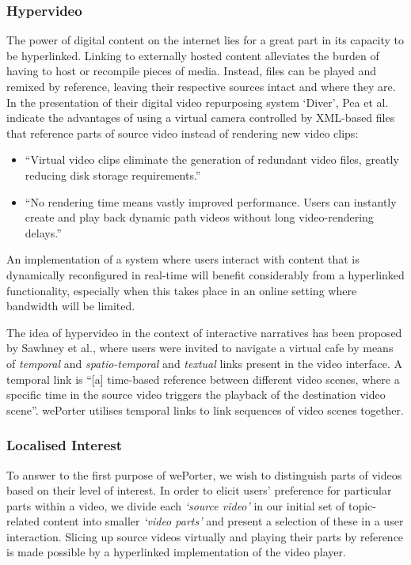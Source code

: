 \subsubsection{Hypervideo}
The power of digital content on the internet lies for a great part in its capacity to be hyperlinked. Linking to externally hosted content alleviates the burden of having to host or recompile pieces of media. Instead, files can be played and remixed by reference, leaving their respective sources intact and where they are. In the presentation of their digital video repurposing system `Diver', Pea et al. indicate the advantages of using a virtual camera controlled by XML-based files that reference parts of source video instead of rendering new video clips\cite{Pea:2004td}:

\begin{itemize}
  \item ``Virtual video clips eliminate the generation of redundant video files, greatly reducing disk storage requirements.''
  \item ``No rendering time means vastly improved performance. Users can instantly create and play back dynamic path videos without long video-rendering delays.''
\end{itemize}

An implementation of a system where users interact with content that is dynamically reconfigured in real-time will benefit considerably from a hyperlinked functionality, especially when this takes place in an online setting where bandwidth will be limited.

The idea of hypervideo in the context of interactive narratives has been proposed by  Sawhney et al., where users were invited to navigate a virtual cafe by means of \emph{temporal} and \emph{spatio-temporal} and \emph{textual} links present in the video interface. A temporal link is  ``[a]	time-based	reference	between different video scenes, where a specific time in the source video triggers the playback of the destination video scene''\cite{Sawhney:1996tk}. wePorter utilises temporal links to link sequences of video scenes together.

\subsubsection{Localised Interest} %
To answer to the first purpose of wePorter, we wish to distinguish parts of videos based on their level of interest. In order to elicit users' preference for particular parts within a video, we divide each \emph{`source video'} in our initial set of topic-related content into smaller \emph{`video parts'} and present a selection of these in a user interaction. Slicing up source videos virtually and playing their parts by reference is made possible by a hyperlinked implementation of the video player.

